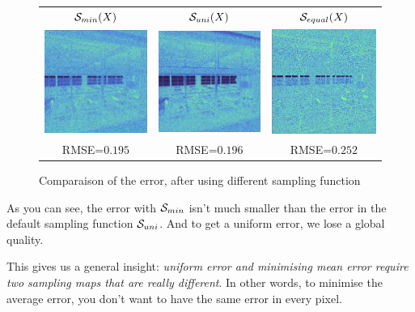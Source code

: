 \documentclass{classeENS}
\begin{document}
\begin{figure}[H]
    \centering
    \caption{Comparaison of the error, after using different sampling function}
    \begin{tabular}{ccc}
    $\mathcal S_{min}(X)$ & $\mathcal S_{uni}(X)$ & $\mathcal S_{equal}(X)$ \\
    \includegraphics[width=45mm]{image/without/RMSE_min.png}
    & \includegraphics[width=45mm]{image/without/RMSE_uni.png}
    & \includegraphics[width=45mm]{image/without/RMSE_mean.png} \\
    RMSE=$0.195$ & RMSE=$0.196$ & RMSE=$0.252$
    \end{tabular}
\end{figure}
As you can see, the error with $\mathcal S_{min}$ isn't much smaller than 
the error in the default sampling function $\mathcal S_{uni}$.
 And to get a uniform error, we lose a global quality. 
\par This gives us a general insight: \textit{uniform error
 and minimising mean error require two sampling maps that 
 are really different}. In other words, to minimise the 
 average error, you don't want to have the same error in 
 every pixel.
\end{document}
